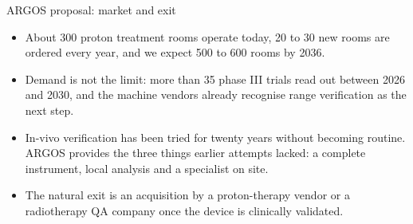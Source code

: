 \documentclass[aspectratio=169,11pt]{beamer}
\begin{document}
\begin{frame}{ARGOS proposal: market and exit}
\small
\begin{itemize}
\setlength{\itemsep}{0.18cm}
\item About 300 proton treatment rooms operate today, 20 to 30 new rooms are ordered every year, and we expect 500 to 600 rooms by 2036.
\item Demand is not the limit: more than 35 phase III trials read out between 2026 and 2030, and the machine vendors already recognise range verification as the next step.
\item In-vivo verification has been tried for twenty years without becoming routine. ARGOS provides the three things earlier attempts lacked: a complete instrument, local analysis and a specialist on site.
\item The natural exit is an acquisition by a proton-therapy vendor or a radiotherapy QA company once the device is clinically validated.
\end{itemize}
\end{frame}
\end{document}
